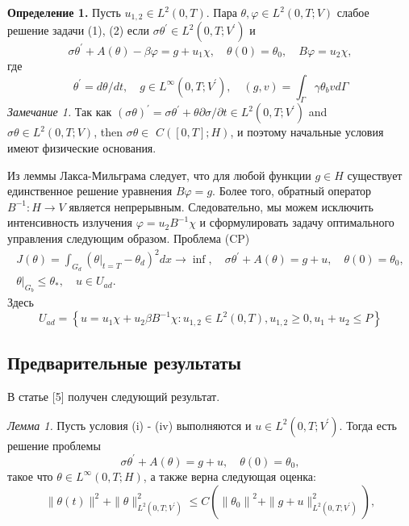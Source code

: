 \textbf{Определение 1.} Пусть $u_{1,2} \in L^{2}(0, T)$.
Пара $\theta, \varphi \in L^{2}(0, T ; V)$ слабое решение задачи (1), (2) если
$\sigma \theta^{\prime} \in L^{2}\left(0, T ; V^{\prime}\right)$ и
\[
    \sigma \theta^{\prime}+A(\theta)-\beta \varphi=g+u_{1} \chi,
    \quad \theta(0)=\theta_{0}, \quad B \varphi=u_{2} \chi,
\]
где
\[
    \theta^{\prime}=d \theta / d t, \quad g \in L^{\infty}\left(0, T ; V^{\prime}\right),
    \quad(g, v)=\int_{\Gamma} \gamma \theta_{b} v d \Gamma
\]
\textit{Замечание 1.} Так как $(\sigma \theta)^{\prime}=\sigma \theta^{\prime}+\theta
\partial \sigma / \partial t \in L^{2}\left(0, T ; V^{\prime}\right)$ and $\sigma
\theta \in L^{2}(0, T ; V)$, then $\sigma \theta \in$ $C([0, T] ; H)$,
и поэтому начальные условия имеют физические основания.

Из леммы Лакса-Мильграма следует, что для любой функции $g \in H$ существует единственное
решение уравнения $B\varphi= g$.
Более того, обратный оператор $B ^{-1}: H \rightarrow V$ является непрерывным.
Следовательно, мы можем исключить интенсивность излучения $\varphi=u_{2} B ^ {-1} \chi$
и сформулировать задачу оптимального управления следующим образом.
Проблема (CP)
\[
    \begin{gathered}
        J(\theta)=\int_{G_{d}}\left(\left.\theta\right|_{t=T}
        - \theta_{d}\right)^{2} d x \rightarrow \inf,
        \quad \sigma \theta^{\prime}+A(\theta)=g+u, \quad \theta(0)=\theta_{0}, \\
        \left.\theta\right|_{G_{b}} \leq \theta_{*}, \quad u \in U_{a d}.
    \end{gathered}
\]
Здесь
\[
    U_{a d}=\left\{u=u_{1} \chi+u_{2} \beta B^{-1} \chi: u_{1,2} \in L^{2}(0, T), u_{1,2}
    \geq 0, u_{1}+u_{2} \leq P\right\}
\]

\subsection{Предварительные результаты}\label{subsec:ch3:sec3:subsec3}
В статье [5] получен следующий результат.

\textit{Лемма 1.}
Пусть условия (i) - (iv) выполняются и $u \in L^{2}\left(0, T ; V^{\prime}\right)$.
Тогда есть решение проблемы
\[
    \sigma \theta^{\prime}+A(\theta)=g+u, \quad \theta(0)=\theta_{0},
\]
такое что $\theta \in L^{\infty}(0, T ; H)$, а также верна следующая оценка:
\[
    \|\theta(t)\|^{2}+\|\theta\|_{L^{2}\left(0, T ; V^{\prime}\right)}^{2}
    \leq C\left(\left\|\theta_{0}\right\|^{2}+\|g+u\|_{L^{2}
    \left(0, T; V^{\prime}\right)}^{2}\right),
\]

